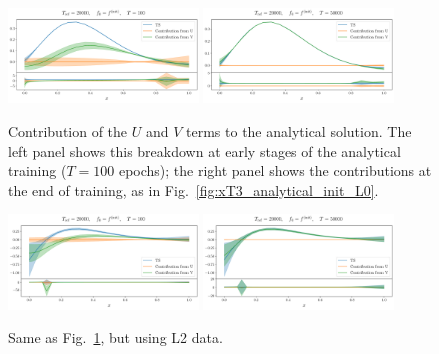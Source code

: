 \begin{figure}[ht!]
    \centering
    \includegraphics[width=0.45\textwidth]{plots/analytical_solution/pdf_plot_u_v_100_L0.pdf}
    \includegraphics[width=0.45\textwidth]{plots/analytical_solution/pdf_plot_u_v_50000_L0.pdf}
    \caption{Contribution of the $U$ and $V$ terms to the analytical solution. The left
    panel shows this breakdown at early stages of the analytical training
    ($T=100$ epochs); the right panel shows the contributions at the end of
    training, as in Fig.~\ref{fig:xT3_analytical_init_L0}.}
    \label{fig:xT3_u_v_contributions_L0}
  \end{figure}

  \begin{figure}[ht!]
    \centering
    \includegraphics[width=0.45\textwidth]{plots/analytical_solution/pdf_plot_u_v_100_L2.pdf}
    \includegraphics[width=0.45\textwidth]{plots/analytical_solution/pdf_plot_u_v_50000_L2.pdf}
    \caption{Same as Fig.~\ref{fig:xT3_u_v_contributions_L0}, but using L2 data.}
    \label{fig:xT3_u_v_contributions_L2}
  \end{figure}



